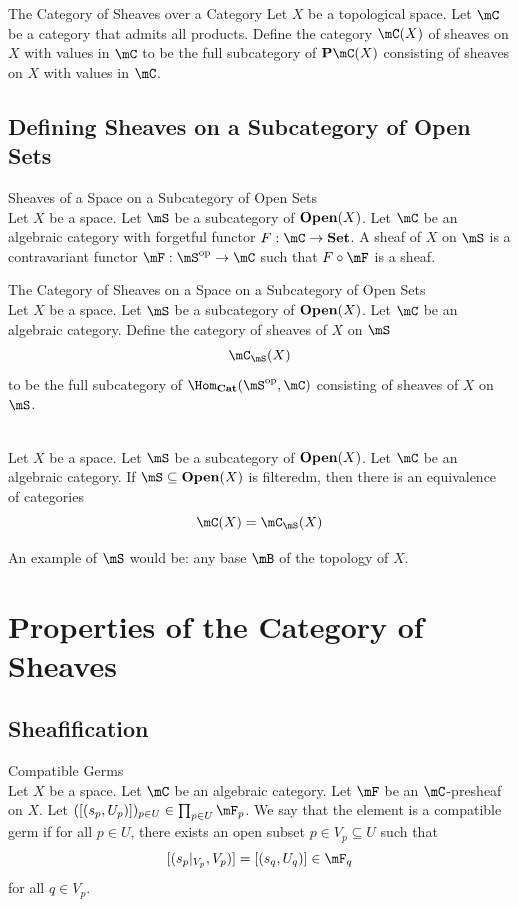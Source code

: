 \documentclass[a4paper]{article}
\begin{document}
\begin{defn}{The Category of Sheaves over a Category}{} Let $X$ be a topological space. Let $\mC$ be a category that admits all products. Define the category $\mC(X)$ of sheaves on $X$ with values in $\mC$ to be the full subcategory of $\bold{P}\mC(X)$ consisting of sheaves on $X$ with values in $\mC$. 
\end{defn}

\subsection{Defining Sheaves on a Subcategory of Open Sets}
\begin{defn}{Sheaves of a Space on a Subcategory of Open Sets}{}\\
Let $X$ be a space. Let $\mS$ be a subcategory of $\bold{Open}(X)$. Let $\mC$ be an algebraic category with forgetful functor $F:\mC\to\bold{Set}$. A sheaf of $X$ on $\mS$ is a contravariant functor $\mF:\mS^\text{op}\to\mC$ such that $F\circ\mF$ is a sheaf. 
\end{defn}

\begin{defn}{The Category of Sheaves on a Space on a Subcategory of Open Sets}{}\\
Let $X$ be a space. Let $\mS$ be a subcategory of $\bold{Open}(X)$. Let $\mC$ be an algebraic category. Define the category of sheaves of $X$ on $\mS$ $$\mC_\mS(X)$$ to be the full subcategory of $\Hom_{\bold{Cat}}(\mS^\text{op},\mC)$ consisting of sheaves of $X$ on $\mS$. 
\end{defn}

\begin{prp}{}{}\\
Let $X$ be a space. Let $\mS$ be a subcategory of $\bold{Open}(X)$. Let $\mC$ be an algebraic category. If $\mS\subseteq\bold{Open}(X)$ is filteredm, then there is an equivalence of categories $$\mC(X)=\mC_\mS(X)$$
\end{prp}

An example of $\mS$ would be: any base $\mB$ of the topology of $X$. 

\pagebreak
\section{Properties of the Category of Sheaves}
\subsection{Sheafification}
\begin{defn}{Compatible Germs}{}\\
Let $X$ be a space. Let $\mC$ be an algebraic category. Let $\mF$ be an $\mC$-presheaf on $X$. Let $([(s_p,U_p)])_{p\in U}\in\prod_{p\in U}\mF_p$. We say that the element is a compatible germ if for all $p\in U$, there exists an open subset $p\in V_p\subseteq U$ such that $$[(s_p|_{V_p},V_p)]=[(s_q,U_q)]\in\mF_q$$ for all $q\in V_p$. 
\end{defn}
\end{document}
